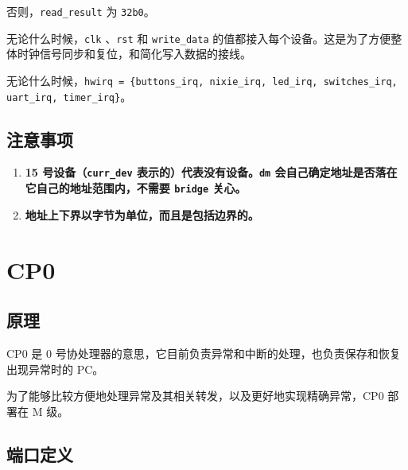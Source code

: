 \documentclass[12pt,AutoFakeBold,AutoFakeSlant]{article}
\providecommand{\tightlist}{%
  \setlength{\itemsep}{0pt}\setlength{\parskip}{0pt}}
\newcommand{\ms}[1]{\texttt{#1}}
\begin{document}
否则，\texttt{read\_result} 为 \texttt{32\textquotesingle{}b0}。

无论什么时候，\texttt{clk} 、\texttt{rst} 和 \ms{write\_data} 的值都接入每个设备。这是为了方便整体时钟信号同步和复位，和简化写入数据的接线。

无论什么时候，\texttt{hwirq = \{buttons\_irq, nixie\_irq, led\_irq, switches\_irq, uart\_irq, timer\_irq\}}。

\hypertarget{ux6ce8ux610fux4e8bux9879-7}{%
\subsection{注意事项}\label{ux6ce8ux610fux4e8bux9879-7}}

\begin{enumerate}
\def\labelenumi{\arabic{enumi}.}
\tightlist
\item
  \textbf{15 号设备（\texttt{curr\_dev} 表示的）代表没有设备。\ms{dm} 会自己确定地址是否落在它自己的地址范围内，不需要 \ms{bridge} 关心。}
\item
  \textbf{地址上下界以字节为单位，而且是包括边界的。}
\end{enumerate}

\hypertarget{cp0}{%
\section{CP0}\label{cp0}}

\hypertarget{ux539fux7406-10}{%
\subsection{原理}\label{ux539fux7406-10}}

CP0 是 0 号协处理器的意思，它目前负责异常和中断的处理，也负责保存和恢复出现异常时的 PC。

为了能够比较方便地处理异常及其相关转发，以及更好地实现精确异常，CP0 部署在 M 级。

\hypertarget{ux7aefux53e3ux5b9aux4e49-8}{%
\subsection{端口定义}\label{ux7aefux53e3ux5b9aux4e49-8}}
\end{document}
